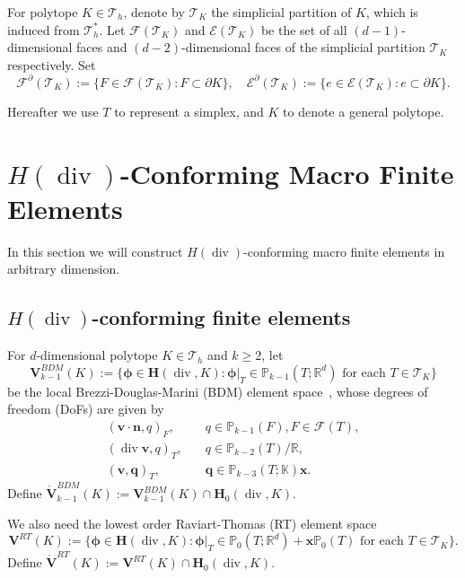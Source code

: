 \documentclass[10pt]{amsart}
\newcommand{\bs}{\boldsymbol}
\renewcommand{\div}{\operatorname{div}}
\numberwithin{equation}{section}
\begin{document}
For polytope $K\in \mathcal T_h$, denote by $\mathcal T_K$ the simplicial partition of $K$, which is induced from $\mathcal T_h^*$. Let $\mathcal{F}(\mathcal T_K)$ and $\mathcal{E}(\mathcal T_K)$ be the set of all $(d-1)$-dimensional faces and $(d-2)$-dimensional faces of the simplicial partition $\mathcal T_K$ respectively. Set 
$$
\mathcal{F}^{\partial}(\mathcal T_K):=\{F\in\mathcal{F}(\mathcal T_K): F\subset\partial K\},\quad \mathcal{E}^{\partial}(\mathcal T_K):=\{e\in\mathcal{E}(\mathcal T_K): e\subset\partial K\}.
$$

Hereafter we use $T$ to represent a simplex, and $K$ to denote a general polytope.




\section{$H(\div)$-Conforming Macro Finite Elements}\label{sec:divmacrofem}

In this section we will construct $H(\div)$-conforming macro finite elements in arbitrary dimension.
\subsection{$H(\div)$-conforming finite elements}
For $d$-dimensional polytope $K\in \mathcal T_h$ and $k\geq2$, let 
$$
\boldsymbol{V}_{k-1}^{BDM}(K):=\{\boldsymbol{\phi}\in\bs H(\div, K): \boldsymbol{\phi}|_{T}\in \mathbb P_{k-1}(T;\mathbb R^d) \textrm{ for each } T\in\mathcal T_K\}
$$ 
be the local Brezzi-Douglas-Marini (BDM) element space~\cite{BrezziDouglasMarini1986,BrezziDouglasDuranFortin1987,Nedelec:1986family}, whose degrees of freedom (DoFs) are given by \cite{ChenHuang2021divdiv}
\begin{align}
(\boldsymbol{v}\cdot\boldsymbol{n}, q)_F, & \quad q\in \mathbb P_{k-1}(F), F\in\mathcal F(T), \label{BDMdof1} \\
(\div\boldsymbol{v}, q)_T, & \quad q\in \mathbb P_{k-2}(T)/\mathbb R, \label{BDMdof2} \\
(\boldsymbol{v}, \boldsymbol{q})_T, & \quad \boldsymbol{q}\in \mathbb P_{k-3}(T;\mathbb K)\boldsymbol{x}. \label{BDMdof3}
\end{align}
Define $\mathring{\boldsymbol{V}}_{k-1}^{BDM}(K):=\boldsymbol{V}_{k-1}^{BDM}(K)\cap \boldsymbol{H}_0(\div, K)$.

We also need the lowest order Raviart-Thomas (RT) element space~\cite{BrezziDouglasMarini1986,BrezziDouglasDuranFortin1987,Nedelec:1986family}
$$
\boldsymbol{V}^{RT}(K):=\{\boldsymbol{\phi}\in\bs H(\div, K): \boldsymbol{\phi}|_{T}\in \mathbb P_{0}(T;\mathbb R^d)+\boldsymbol{x}\mathbb P_{0}(T) \textrm{ for each } T\in\mathcal T_K\}.
$$
Define $\mathring{\boldsymbol{V}}^{RT}(K):=\boldsymbol{V}^{RT}(K)\cap \boldsymbol{H}_0(\div, K)$.
\end{document}

